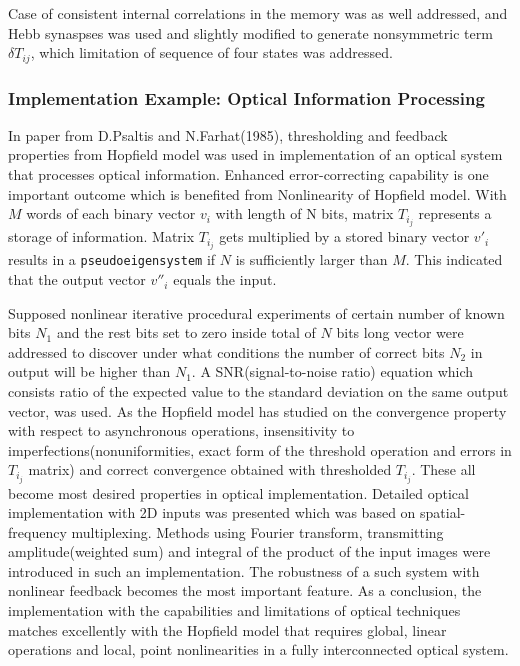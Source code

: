 \documentclass[12pt, a4paper]{article}
\begin{document}
Case of consistent internal correlations in the memory was as well addressed, and Hebb synaspses was used and slightly modified to generate nonsymmetric term~$\delta T_{ij}$, which limitation of sequence of four states was addressed.


\subsubsection{Implementation Example: Optical Information Processing}
In paper from D.Psaltis and N.Farhat(1985), thresholding and feedback properties from Hopfield model was used in implementation of an optical system that processes optical information.
Enhanced error-correcting capability is one important outcome which is benefited from Nonlinearity of Hopfield model. With $M$ words of each binary vector $v_i$ with length of N bits, matrix $T_i_j$ represents a storage of information. Matrix $T_i_j$ gets multiplied by a stored binary vector $v'_i$ results in a \texttt{pseudoeigensystem} if $N$ is sufficiently larger than $M$. This indicated that the output vector $v''_i$ equals the input.

Supposed nonlinear iterative procedural experiments of certain number of known bits $N_1$ and the rest bits set to zero inside total of $N$ bits long vector were addressed to discover under what conditions the number of correct bits $N_2$ in output will be higher than $N_1$. A SNR(signal-to-noise ratio) equation which consists ratio of the expected value to the standard deviation on the same output vector, was used. As the Hopfield model has studied on the convergence property with respect to asynchronous operations, insensitivity to imperfections(nonuniformities, exact form of the threshold operation and errors in $T_i_j$ matrix) and correct convergence obtained with thresholded $T_i_j$. These all become most desired properties in optical implementation. Detailed optical implementation with 2D inputs was presented which was based on spatial-frequency multiplexing. Methods using Fourier transform, transmitting amplitude(weighted sum) and integral of the product of the input images were introduced in such an implementation. The robustness of a such system with nonlinear feedback becomes the most important feature.
As a conclusion, the implementation with the capabilities and limitations of optical techniques matches excellently with the Hopfield model that requires global, linear operations and local, point nonlinearities in a fully interconnected optical system.
\end{document}
